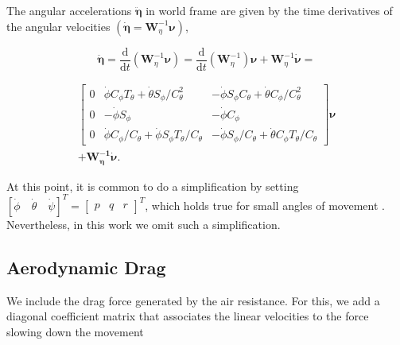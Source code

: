 The angular accelerations $\ddot{\boldsymbol{\eta}}$ in world frame are given by the time derivatives of the angular velocities $\left(\dot{\boldsymbol{\eta}} = \boldsymbol{W}_{\eta}^{-1} \boldsymbol{\nu}\right)$,

$$\ddot{\boldsymbol{\eta}}=\frac{\mathrm{d}}{\mathrm{d} t}\left(\boldsymbol{W}_{\eta}^{-1} \boldsymbol{\nu}\right) =\frac{\mathrm{d}}{\mathrm{d} t}\left(\boldsymbol{W}_{\eta}^{-1}\right) \boldsymbol{\nu}+\boldsymbol{W}_{\eta}^{-1} \dot{\boldsymbol{\nu}} = $$

$$
\begin{array}{c}
\left[ \begin{array}{cccc}{0} & {\dot{\phi} C_{\phi} T_{\theta}+\dot{\theta} S_{\phi} / C_{\theta}^{2}} & {-\dot{\phi} S_{\phi} C_{\theta}+\dot{\theta} C_{\phi} / C_{\theta}^{2}} \\ {0} & {-\dot{\phi} S_{\phi}} & {-\dot{\phi} C_{\phi}} \\ {0} & {\dot{\phi} C_{\phi} / C_{\theta}+\dot{\phi} S_{\phi} T_{\theta} / C_{\theta}} & {-\dot{\phi} S_{\phi} / C_{\theta}+\dot{\theta} C_{\phi} T_{\theta} / C_{\theta}}\end{array}\right] \boldsymbol{\nu}
\\ + \boldsymbol{W_{\eta}^{-1}} \dot{\boldsymbol{\nu}}.
\end{array}
  $$

At this point, it is common to do a simplification by setting $[\dot{\phi} \quad \dot{\theta} \quad \dot{\psi}]^{T}=\left[ \begin{array}{lll}{p} & {q} & {r}\end{array}\right]^{T}$, which holds true for small angles of movement \cite{Sabatino2015}.
  Nevertheless, in this work we omit such a simplification.

\subsection{Aerodynamic Drag}
\label{ssec:drag}

  We include the drag force generated by the air resistance. For this, we add a diagonal coefficient matrix that associates the linear velocities to the force slowing down the movement

